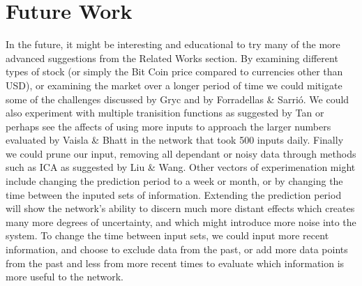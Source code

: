 \documentclass[a4paper,11pt]{article}
\begin{document}
\section{Future Work}

In the future, it might be interesting and educational to try many of the more advanced suggestions from the Related Works section. By examining different types of stock (or simply the Bit Coin price compared to currencies other than USD), or examining the market over a longer period of time we could mitigate some of the challenges discussed by Gryc and  by Forradellas \& Sarrió. We could also experiment with multiple tranisition functions as suggested by Tan or perhaps see the affects of using more inputs to approach the larger numbers evaluated by Vaisla \& Bhatt in the network that took 500 inputs daily. Finally we could prune our input, removing all dependant or noisy data through methods such as ICA as suggested by Liu \& Wang. Other vectors of experimenation might include changing the prediction period to a week or month, or by changing the time between the inputed sets of information. Extending the prediction period will show the network's ability to discern much more distant effects which creates many more degrees of uncertainty, and which might introduce more noise into the 
system. To change the time between input sets, we could input more recent information, and choose to exclude data from the past, or add more data points from the past and less from more recent times to evaluate which information is more useful to the network.
\end{document}
